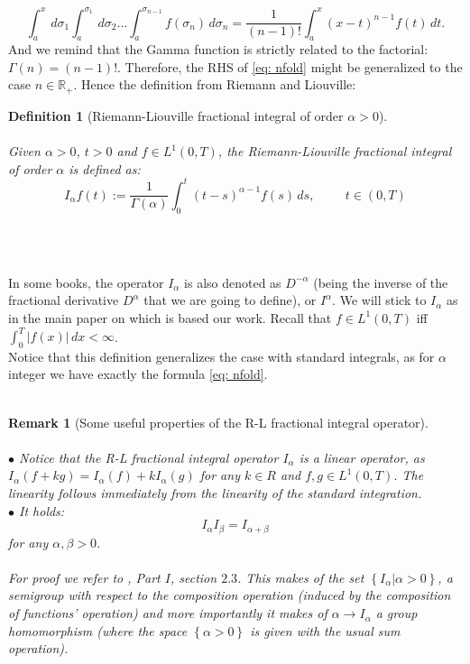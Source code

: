 \documentclass[a4paper,italian,11pt]{book}
\newtheorem{remark}{Remark}
\theoremstyle{plain}
\newtheorem{definition}{Definition}
\theoremstyle{remark}
\theoremstyle{plain}
\begin{document}
\begin{equation}
    \label{eq: nfold}
    \int_a^x \, d\sigma_1 \int_a^{\sigma_1 } \,d\sigma_2 ... \int_a^{\sigma_{n-1}} f(\sigma_n)\, d\sigma_n = \frac{1}{(n-1)!}\int_a^x (x-t)^{n-1}f(t)\,dt.
\end{equation}
And we remind that the Gamma function is strictly related to the factorial: $\Gamma(n) = (n-1)!$. Therefore, the RHS of \eqref{eq: nfold} might be generalized to the case $n\in \mathbb{R}_+$. Hence the definition from Riemann and Liouville:

\begin{definition}[Riemann-Liouville fractional integral of order $\alpha>0$]
\\\
\\
Given $\alpha>0$, $t>0$ and $f\in L^1(0,T)$, the Riemann-Liouville fractional integral of order $\alpha$ is defined as: 
\begin{equation}
    \label{eq: integralalfa}
    I_{\alpha} f(t) := \frac{1}{\Gamma(\alpha)}\int_{0}^t (t-s)^{\alpha-1} f(s)\,ds, \hspace{1cm} t\in (0,T)
\end{equation}


\end{definition}
\\\

In some books, the operator $I_\alpha$ is also denoted as $D^{-\alpha}$ (being the inverse of the fractional derivative $D^\alpha$ that we are going to define), or $I^{\alpha}$. We will stick to $I_\alpha$ as in the main paper \cite{Main} on which is based our work. 
Recall that $f\in L^1(0,T)$ iff $\int_0^T |f(x)|\, dx <\infty$.
\\
Notice that this definition generalizes the case with standard integrals, as for $\alpha$ integer we have exactly the formula \eqref{eq: nfold}.
\\\
\begin{remark}[Some useful properties of the R-L fractional integral operator]
\\\
\\
\textit{
$\bullet$ Notice that the R-L fractional integral operator $I_\alpha$ is a linear operator, as $I_\alpha (f + k g ) = I_\alpha (f) + k I_\alpha(g)$ for any $k\in R$ and $f,g\in L^1(0,T)$. The linearity follows immediately from the linearity of the standard integration.
\\
$\bullet$ It holds: 
\begin{equation}
    \label{eq: semigroupI}
    I_\alpha I_\beta = I_{\alpha + \beta}
\end{equation}
for any $\alpha,\beta >0$. 
}
\\
\\
For proof we refer to \cite{libro19}, Part $I$, section $2.3$. This makes of the set $\left\{ I_\alpha | \alpha>0 \right\}$, a semigroup with respect to the composition operation (induced by the composition of functions' operation) and
more importantly it makes of $\alpha \to I_\alpha$ a group homomorphism (where the space $\left\{ \alpha >0\right\}$ is given with the usual sum operation).
\end{remark}
\\\
\end{document}
